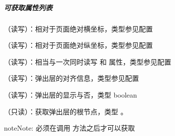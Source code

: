 \documentclass[letterpaper,10pt,english]{sphinxmanual}
\begin{document}
\subparagraph{可获取属性列表}
\label{api/component/overlay/overlay:id4}

\begin{fulllineitems}
（读写）：相对于页面绝对横坐标，类型参见配置

\end{fulllineitems}



\begin{fulllineitems}
（读写）：相对于页面绝对纵坐标，类型参见配置

\end{fulllineitems}



\begin{fulllineitems}
（读写）：相当与一次同时读写 {\hyperref[api/component/overlay/overlay:Overlay.x]{}} 和 {\hyperref[api/component/overlay/overlay:Overlay.y]{}} 属性，类型参见配置

\end{fulllineitems}



\begin{fulllineitems}
（读写）：弹出层的对齐信息，类型参见配置

\end{fulllineitems}



\begin{fulllineitems}
\label{api/component/overlay/overlay:Overlay.visible}
（读写）：弹出层的显示与否，类型 boolean

\end{fulllineitems}



\begin{fulllineitems}
\label{api/component/overlay/overlay:Overlay.el}
（只读）：获取弹出层的根节点，类型  。

\begin{notice}{note}{Note:}
必须在调用 {\hyperref[api/component/overlay/overlay:Overlay.Overlay.render]{}} 方法之后才可以获取
\end{notice}

\end{fulllineitems}
\end{document}
